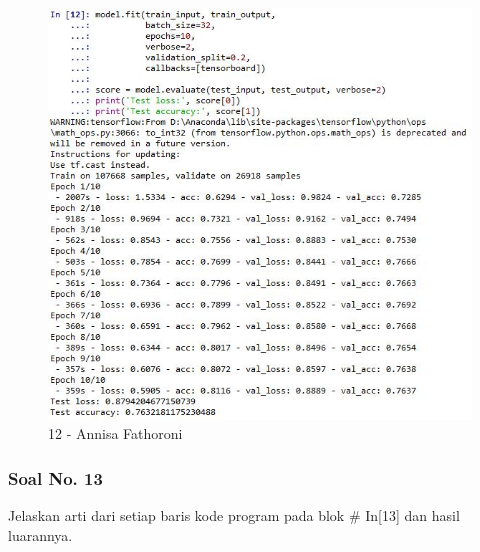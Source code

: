 \begin{itemize}
\begin{figure}[!hbtp]
\centering
\includegraphics[scale=0.7]{figures/Chapter 7/1164067/Praktek/Chapter7AnnisaFathoroni12.jpg}
\caption{12 - Annisa Fathoroni}
\label{12 - Annisa Fathoroni}
\end{figure}

\end{itemize}

\subsubsection{Soal No. 13}
Jelaskan arti dari setiap baris kode program pada blok \# In[13] dan hasil luarannya.

